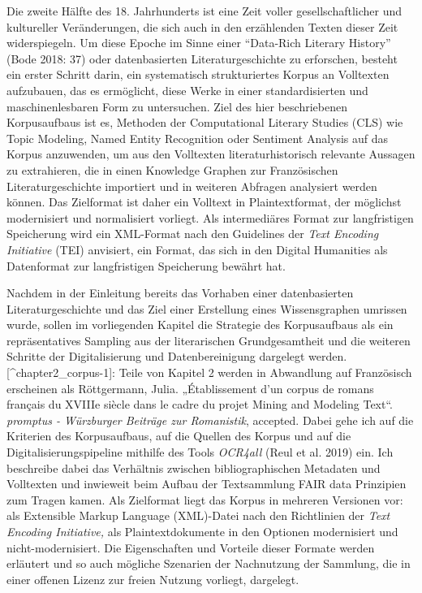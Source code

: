 \documentclass[
  12pt,
  letterpaper,
  DIV=11,
  numbers=noendperiod]{scrreprt}
\begin{document}
Die zweite Hälfte des 18. Jahrhunderts ist eine Zeit voller
gesellschaftlicher und kultureller Veränderungen, die sich auch in den
erzählenden Texten dieser Zeit widerspiegeln. Um diese Epoche im Sinne
einer ``Data-Rich Literary History'' (Bode 2018: 37) oder datenbasierten
Literaturgeschichte zu erforschen, besteht ein erster Schritt darin, ein
systematisch strukturiertes Korpus an Volltexten aufzubauen, das es
ermöglicht, diese Werke in einer standardisierten und maschinenlesbaren
Form zu untersuchen. Ziel des hier beschriebenen Korpusaufbaus ist es,
Methoden der Computational Literary Studies (CLS) wie Topic Modeling,
Named Entity Recognition oder Sentiment Analysis auf das Korpus
anzuwenden, um aus den Volltexten literaturhistorisch relevante Aussagen
zu extrahieren, die in einen Knowledge Graphen zur Französischen
Literaturgeschichte importiert und in weiteren Abfragen analysiert
werden können. Das Zielformat ist daher ein Volltext in Plaintextformat,
der möglichst modernisiert und normalisiert vorliegt. Als intermediäres
Format zur langfristigen Speicherung wird ein XML-Format nach den
Guidelines der \emph{Text Encoding Initiative} (TEI) anvisiert, ein
Format, das sich in den Digital Humanities als Datenformat zur
langfristigen Speicherung bewährt hat.

Nachdem in der Einleitung bereits das Vorhaben einer datenbasierten
Literaturgeschichte und das Ziel einer Erstellung eines Wissensgraphen
umrissen wurde, sollen im vorliegenden Kapitel die Strategie des
Korpusaufbaus als ein repräsentatives Sampling aus der literarischen
Grundgesamtheit und die weiteren Schritte der Digitalisierung und
Datenbereinigung dargelegt werden.{[}\^{}chapter2\_corpus-1{]}: Teile
von Kapitel 2 werden in Abwandlung auf Französisch erscheinen als
Röttgermann, Julia. „Établissement d'un corpus de romans français du
XVIIIe siècle dans le cadre du projet Mining and Modeling Text``.
\emph{promptus - Würzburger Beiträge zur Romanistik}, accepted. Dabei
gehe ich auf die Kriterien des Korpusaufbaus, auf die Quellen des Korpus
und auf die Digitalisierungspipeline mithilfe des Tools \emph{OCR4all}
(Reul et al. 2019) ein. Ich beschreibe dabei das Verhältnis zwischen
bibliographischen Metadaten und Volltexten und inwieweit beim Aufbau der
Textsammlung FAIR data Prinzipien zum Tragen kamen. Als Zielformat liegt
das Korpus in mehreren Versionen vor: als Extensible Markup Language
(XML)-Datei nach den Richtlinien der \emph{Text Encoding Initiative,}
als Plaintextdokumente in den Optionen modernisiert und
nicht-modernisiert. Die Eigenschaften und Vorteile dieser Formate werden
erläutert und so auch mögliche Szenarien der Nachnutzung der Sammlung,
die in einer offenen Lizenz zur freien Nutzung vorliegt, dargelegt.
\end{document}
